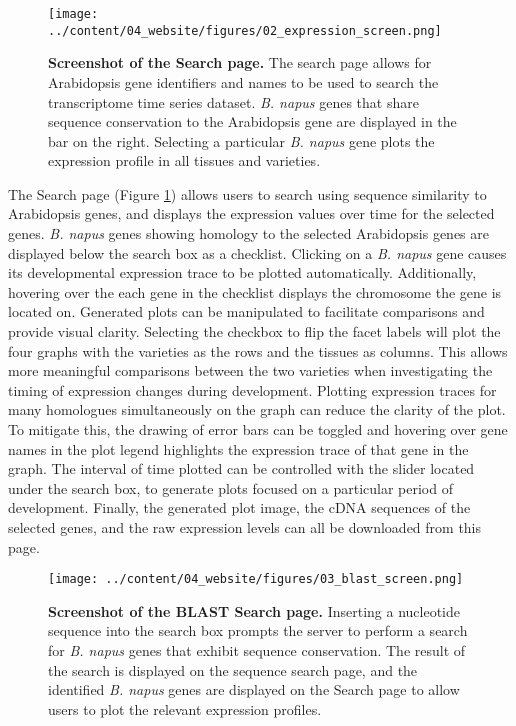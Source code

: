 \documentclass[12pt,]{book}
\begin{document}
\begin{figure}[htbp]
\centering
\texttt{[image: ../content/04\_website/figures/02\_expression\_screen.png]}
\caption{\textbf{Screenshot of the Search page.} The search page allows
for Arabidopsis gene identifiers and names to be used to search the
transcriptome time series dataset. \emph{B. napus} genes that share
sequence conservation to the Arabidopsis gene are displayed in the bar
on the right. Selecting a particular \emph{B. napus} gene plots the
expression profile in all tissues and
varieties.}\label{figure:website:search}
\end{figure}

The Search page (Figure \ref{figure:website:search}) allows users to
search using sequence similarity to Arabidopsis genes, and displays the
expression values over time for the selected genes. \emph{B. napus}
genes showing homology to the selected Arabidopsis genes are displayed
below the search box as a checklist. Clicking on a \emph{B. napus} gene
causes its developmental expression trace to be plotted automatically.
Additionally, hovering over the each gene in the checklist displays the
chromosome the gene is located on. Generated plots can be manipulated to
facilitate comparisons and provide visual clarity. Selecting the
checkbox to flip the facet labels will plot the four graphs with the
varieties as the rows and the tissues as columns. This allows more
meaningful comparisons between the two varieties when investigating the
timing of expression changes during development. Plotting expression
traces for many homologues simultaneously on the graph can reduce the
clarity of the plot. To mitigate this, the drawing of error bars can be
toggled and hovering over gene names in the plot legend highlights the
expression trace of that gene in the graph. The interval of time plotted
can be controlled with the slider located under the search box, to
generate plots focused on a particular period of development. Finally,
the generated plot image, the cDNA sequences of the selected genes, and
the raw expression levels can all be downloaded from this page.

\begin{figure}[htbp]
\centering
\texttt{[image: ../content/04\_website/figures/03\_blast\_screen.png]}
\caption{\textbf{Screenshot of the BLAST Search page.} Inserting a
nucleotide sequence into the search box prompts the server to perform a
search for \emph{B. napus} genes that exhibit sequence conservation. The
result of the search is displayed on the sequence search page, and the
identified \emph{B. napus} genes are displayed on the Search page to
allow users to plot the relevant expression
profiles.}\label{figure:website:blast}
\end{figure}
\end{document}
